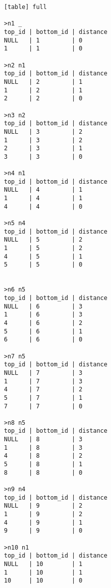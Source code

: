 \begin{verbatim}[table] full

>n1 _
top_id | bottom_id | distance
NULL   | 1         | 0
1      | 1         | 0

>n2 n1
top_id | bottom_id | distance
NULL   | 2         | 1
1      | 2         | 1
2      | 2         | 0

>n3 n2
top_id | bottom_id | distance
NULL   | 3         | 2
1      | 3         | 2
2      | 3         | 1
3      | 3         | 0

>n4 n1
top_id | bottom_id | distance
NULL   | 4         | 1
1      | 4         | 1
4      | 4         | 0

>n5 n4
top_id | bottom_id | distance
NULL   | 5         | 2
1      | 5         | 2
4      | 5         | 1
5      | 5         | 0


>n6 n5
top_id | bottom_id | distance
NULL   | 6         | 3
1      | 6         | 3
4      | 6         | 2
5      | 6         | 1
6      | 6         | 0

>n7 n5
top_id | bottom_id | distance
NULL   | 7         | 3
1      | 7         | 3
4      | 7         | 2
5      | 7         | 1
7      | 7         | 0

>n8 n5
top_id | bottom_id | distance
NULL   | 8         | 3
1      | 8         | 3
4      | 8         | 2
5      | 8         | 1
8      | 8         | 0

>n9 n4
top_id | bottom_id | distance
NULL   | 9         | 2
1      | 9         | 2
4      | 9         | 1
9      | 9         | 0

>n10 n1
top_id | bottom_id | distance
NULL   | 10        | 1
1      | 10        | 1
10     | 10        | 0

\end{verbatim}











